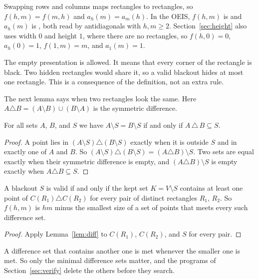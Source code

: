 Swapping rows and columns maps rectangles to rectangles, so $f(h,m)=f(m,h)$ and
$a_h(m)=a_m(h)$. In the OEIS, $f(h,m)$ is  and $a_h(m)$ is
, both read by antidiagonals with $h,m\ge2$. Section~\ref{sec:height}
also uses width $0$ and height $1$, where there are no rectangles, so $f(h,0)=0$,
$a_h(0)=1$, $f(1,m)=m$, and $a_1(m)=1$.

\begin{remark}\label{rem:empty}
The empty presentation is allowed. It means that every corner of the rectangle is
black. Two hidden rectangles would share it, so a valid blackout hides at most one
rectangle. This is a consequence of the definition, not an extra rule.
\end{remark}

The next lemma says when two rectangles look the same. Here
$A\triangle B=(A\setminus B)\cup(B\setminus A)$ is the symmetric difference.

\begin{lemma}\label{lem:diff}
For all sets $A$, $B$, and $S$ we have $A\setminus S=B\setminus S$ if and only if
$A\,\triangle\,B\subseteq S$.
\end{lemma}

\begin{proof}
A point lies in $(A\setminus S)\triangle(B\setminus S)$ exactly when it is outside
$S$ and in exactly one of $A$ and $B$. So
$(A\setminus S)\triangle(B\setminus S)=(A\triangle B)\setminus S$. Two sets are
equal exactly when their symmetric difference is empty, and
$(A\triangle B)\setminus S$ is empty exactly when $A\triangle B\subseteq S$.
\end{proof}

\begin{corollary}\label{cor:hitting}
A blackout $S$ is valid if and only if the kept set $K=V\setminus S$ contains at
least one point of $C(R_1)\triangle C(R_2)$ for every pair of distinct rectangles
$R_1$, $R_2$. So $f(h,m)$ is $hm$ minus the smallest size of a set of points that
meets every such difference set.
\end{corollary}

\begin{proof}
Apply Lemma~\ref{lem:diff} to $C(R_1)$, $C(R_2)$, and $S$ for every pair.
\end{proof}

A difference set that contains another one is met whenever the smaller one is met.
So only the minimal difference sets matter, and the programs of
Section~\ref{sec:verify} delete the others before they search.

